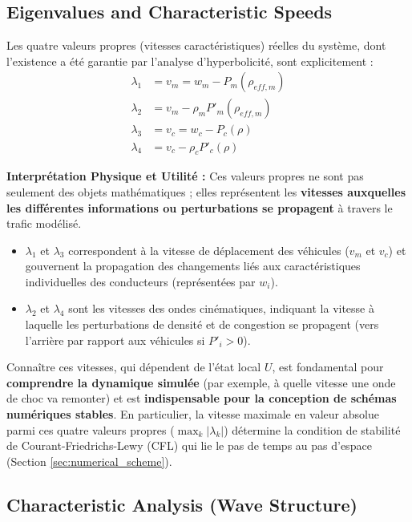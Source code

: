 \subsection{Eigenvalues and Characteristic Speeds}
\label{subsec:eigenvalues}

Les quatre valeurs propres (vitesses caractéristiques) réelles du système, dont l'existence a été garantie par l'analyse d'hyperbolicité, sont explicitement :
\begin{align}
    \label{eq:lambda1_rev}
    \lambda_1 &= v_m = w_m - P_m(\rho_{eff,m}) \\
    \label{eq:lambda2_rev}
    \lambda_2 &= v_m - \rho_m P'_m(\rho_{eff,m}) \\
    \label{eq:lambda3_rev}
    \lambda_3 &= v_c = w_c - P_c(\rho) \\
    \label{eq:lambda4_rev}
    \lambda_4 &= v_c - \rho_c P'_c(\rho)
\end{align}

\textbf{Interprétation Physique et Utilité :} Ces valeurs propres ne sont pas seulement des objets mathématiques ; elles représentent les \textbf{vitesses auxquelles les différentes informations ou perturbations se propagent} à travers le trafic modélisé.
\begin{itemize}
    \item \( \lambda_1 \) et \( \lambda_3 \) correspondent à la vitesse de déplacement des véhicules (\( v_m \) et \( v_c \)) et gouvernent la propagation des changements liés aux caractéristiques individuelles des conducteurs (représentées par \( w_i \)).
    \item \( \lambda_2 \) et \( \lambda_4 \) sont les vitesses des ondes cinématiques, indiquant la vitesse à laquelle les perturbations de densité et de congestion se propagent (vers l'arrière par rapport aux véhicules si \( P'_i > 0 \)).
\end{itemize}
Connaître ces vitesses, qui dépendent de l'état local \( U \), est fondamental pour \textbf{comprendre la dynamique simulée} (par exemple, à quelle vitesse une onde de choc va remonter) et est \textbf{indispensable pour la conception de schémas numériques stables}. En particulier, la vitesse maximale en valeur absolue parmi ces quatre valeurs propres (\( \max_k |\lambda_k| \)) détermine la condition de stabilité de Courant-Friedrichs-Lewy (CFL) qui lie le pas de temps au pas d'espace (Section \ref{sec:numerical_scheme}).

\subsection{Characteristic Analysis (Wave Structure)}
\label{subsec:characteristic_analysis}

